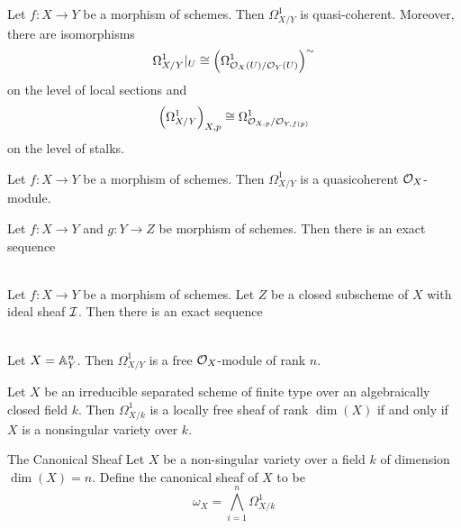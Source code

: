 \documentclass[a4paper]{article}
\begin{document}
\begin{prp}{}{} Let $f:X\to Y$ be a morphism of schemes. Then $\Omega_{X/Y}^1$ is quasi-coherent. Moreover, there are isomorphisms $$\Omega_{X/Y}^1|_U\cong\left(\Omega_{\mathcal{O}_X(U)/\mathcal{O}_Y(U)}^1\right)^\sim$$ on the level of local sections and $$\left(\Omega_{X/Y}^1\right)_{X,p}\cong\Omega_{\mathcal{O}_{X,p}/\mathcal{O}_{Y,f(p)}}^1$$ on the level of stalks. 
\end{prp}

\begin{prp}{}{} Let $f:X\to Y$ be a morphism of schemes. Then $\Omega_{X/Y}^1$ is a quasicoherent $\mathcal{O}_X$-module. 
\end{prp}

\begin{prp}{}{} Let $f:X\to Y$ and $g:Y\to Z$ be morphism of schemes. Then there is an exact sequence \\~\\
\end{prp}

\begin{prp}{}{} Let $f:X\to Y$ be a morphism of schemes. Let $Z$ be a closed subscheme of $X$ with ideal sheaf $\mathcal{I}$. Then there is an exact sequence \\~\\
\end{prp}

\begin{lmm}{}{} Let $X=\mathbb{A}_Y^n$. Then $\Omega_{X/Y}^1$ is a free $\mathcal{O}_X$-module of rank $n$. 
\end{lmm}

\begin{thm}{}{} Let $X$ be an irreducible separated scheme of finite type over an algebraically closed field $k$. Then $\Omega_{X/k}^1$ is a locally free sheaf of rank $\dim(X)$ if and only if $X$ is a nonsingular variety over $k$. 
\end{thm}

\begin{defn}{The Canonical Sheaf}{} Let $X$ be a non-singular variety over a field $k$ of dimension $\dim(X)=n$. Define the canonical sheaf of $X$ to be $$\omega_X=\bigwedge_{i=1}^n\Omega_{X/k}^1$$
\end{defn}
\end{document}

